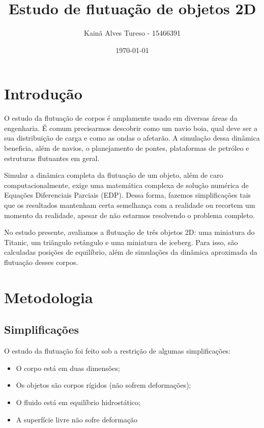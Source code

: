 \documentclass[
	12pt,				%
	oneside,			%
	a4paper,			%
	]{article}
\author{Kainã Alves Tureso - 15466391}
\date{\today}
\title{Estudo de flutuação de objetos 2D}
\begin{document}
    \maketitle    
    \tableofcontents
    \break


    \section{Introdução}
    O estudo da flutuação de corpos é amplamente usado em diversas áreas da engenharia. É comum precisarmos descobrir como um navio boia, qual deve ser a sua distribuição de carga e como as ondas o afetarão. A simulação dessa dinâmica beneficia, além de navios, o planejamento de pontes, plataformas de petróleo e estruturas flutuantes em geral.
    
    Simular a dinâmica completa da flutuação de um objeto, além de caro computacionalmente, exige uma matemática complexa de solução numérica de Equações Diferenciais Parciais (EDP). Dessa forma, fazemos simplificações tais que os resultados mantenham certa semelhança com a realidade ou recortem um momento da realidade, apesar de não estarmos resolvendo o problema completo.
    
    No estudo presente, avaliamos a flutuação de três objetos 2D: uma miniatura do Titanic, um triângulo retângulo e uma miniatura de iceberg. Para isso, são calculadas posições de equilíbrio, além de simulações da dinâmica aproximada da flutuação desses corpos.

    
    
    \section{Metodologia}
    
    \subsection{Simplificações}
    O estudo da flutuação foi feito sob a restrição de algumas simplificações:
    \begin{itemize}
        \item O corpo está em duas dimensões;
        \item Os objetos são corpos rígidos (não sofrem deformações);
        \item O fluido está em equilíbrio hidrostático;
        \item A superfície livre não sofre deformação
    \end{itemize}
\end{document}
